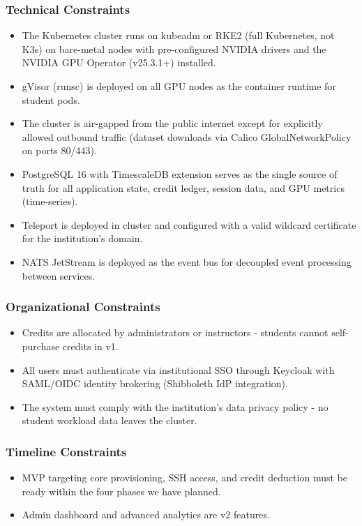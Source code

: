 \documentclass[12pt,a4paper]{article}
\begin{document}
\subsubsection*{Technical Constraints}
\begin{itemize}[leftmargin=1.5em]
  \item The Kubernetes cluster runs on kubeadm or RKE2 (full Kubernetes, not K3s) on bare-metal nodes with pre-configured NVIDIA drivers and the NVIDIA GPU Operator (v25.3.1+) installed.
  \item gVisor (runsc) is deployed on all GPU nodes as the container runtime for student pods.
  \item The cluster is air-gapped from the public internet except for explicitly allowed outbound traffic (dataset downloads via Calico GlobalNetworkPolicy on ports 80/443).
  \item PostgreSQL 16 with TimescaleDB extension serves as the single source of truth for all application state, credit ledger, session data, and GPU metrics (time-series).
  \item Teleport is deployed in cluster and configured with a valid wildcard certificate for the institution's domain.
  \item NATS JetStream is deployed as the event bus for decoupled event processing between services.
\end{itemize}

\subsubsection*{Organizational Constraints}
\begin{itemize}[leftmargin=1.5em]
  \item Credits are allocated by administrators or instructors - students cannot self-purchase credits in v1.
  \item All users must authenticate via institutional SSO through Keycloak with SAML/OIDC identity brokering (Shibboleth IdP integration).
  \item The system must comply with the institution's data privacy policy - no student workload data leaves the cluster.
\end{itemize}

\subsubsection*{Timeline Constraints}
\begin{itemize}[leftmargin=1.5em]
  \item MVP targeting core provisioning, SSH access, and credit deduction must be ready within the four phases we have planned. 
  \item Admin dashboard and advanced analytics are v2 features.
\end{itemize}
\end{document}
